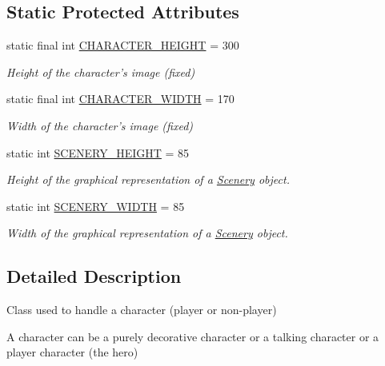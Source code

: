\subsection*{Static Protected Attributes}
\begin{DoxyCompactItemize}
\item 
static final int \hyperlink{classworld_1_1character_1_1_character_a31596c03022d61aeb8aac56f149309be}{C\-H\-A\-R\-A\-C\-T\-E\-R\-\_\-\-H\-E\-I\-G\-H\-T} = 300
\begin{DoxyCompactList}\small\item\em Height of the character's image (fixed) \end{DoxyCompactList}\item 
static final int \hyperlink{classworld_1_1character_1_1_character_a2a46ba03b3e10896b7757f891336e8b8}{C\-H\-A\-R\-A\-C\-T\-E\-R\-\_\-\-W\-I\-D\-T\-H} = 170
\begin{DoxyCompactList}\small\item\em Width of the character's image (fixed) \end{DoxyCompactList}\item 
static int \hyperlink{classworld_1_1scenery_1_1_scenery_a106e53ae6e1647395740237ccce7f363}{S\-C\-E\-N\-E\-R\-Y\-\_\-\-H\-E\-I\-G\-H\-T} = 85
\begin{DoxyCompactList}\small\item\em Height of the graphical representation of a \hyperlink{classworld_1_1scenery_1_1_scenery}{Scenery} object. \end{DoxyCompactList}\item 
static int \hyperlink{classworld_1_1scenery_1_1_scenery_affb047c028883c6d069a03ef0f1caeb8}{S\-C\-E\-N\-E\-R\-Y\-\_\-\-W\-I\-D\-T\-H} = 85
\begin{DoxyCompactList}\small\item\em Width of the graphical representation of a \hyperlink{classworld_1_1scenery_1_1_scenery}{Scenery} object. \end{DoxyCompactList}\end{DoxyCompactItemize}


\subsection{Detailed Description}
Class used to handle a character (player or non-\/player) 

A character can be a purely decorative character or a talking character or a player character (the hero) 

